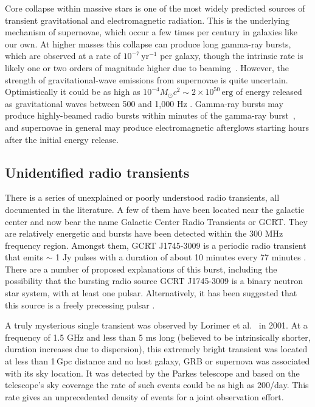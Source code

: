 Core collapse within massive stars is one of the most widely predicted sources of
transient gravitational and electromagnetic radiation.  This is the underlying
mechanism of supernovae, which occur a few times per century in galaxies
like our own.  At higher masses this collapse can produce long gamma-ray
bursts, which are observed at a rate of $10^{-7}\,\mathrm{yr}^{-1}$ per
galaxy, though the intrinsic rate is likely one or two orders of
magnitude higher due to beaming~\cite{Sadowski:2007dz}. However, the strength of
gravitational-wave emissions from supernovae is quite uncertain.
Optimistically it could be as high as $10^{-4}M_\odot c^2 \sim 2 \times 10^{50}\,\mathrm{erg}$ of energy
released as gravitational waves between 500 and 1,000 Hz
\cite{ott:201102}. Gamma-ray bursts may produce highly-beamed radio bursts within minutes of the gamma-ray burst~\cite{Usov:2000yr}, and supernovae in
general may produce electromagnetic afterglows starting hours after the
initial energy release.


\subsection{Unidentified radio transients}

There is a series of unexplained or poorly understood radio
transients, all documented in the literature.  A few of them have
been located near the galactic center and now bear the name Galactic
Center Radio Transients or GCRT. They are relatively energetic and
bursts have been detected within the 300 MHz frequency region.
Amongst them, GCRT J1745-3009 is a periodic radio transient that
emits $\sim$ 1 Jy pulses with a duration of about 10 minutes every
77 minutes \cite{Hyman:2005ng}.  There are a number of proposed
explanations of this burst, including \cite{turolla} the possibility
that the bursting radio source GCRT J1745-3009 is a binary neutron
star system, with at least one pulsar.  Alternatively, it has been
suggested that this source is a freely precessing pulsar
\cite{Zhu:2005yh}.   

A truly mysterious single transient was observed by Lorimer et al.\
\cite{Lorimer11022007} in 2001. At a frequency of 1.5
GHz and less than 5 ms long (believed to be intrinsically shorter,
duration increases due to dispersion), this extremely bright
transient was located at less than 1\,Gpc distance and no host galaxy,
GRB or supernova was associated with its sky location.  It was
detected by the Parkes telescope and based on the telescope's sky
coverage the rate of such events could be as high as 200/day. This
rate gives an unprecedented density of events for a joint
observation effort.

